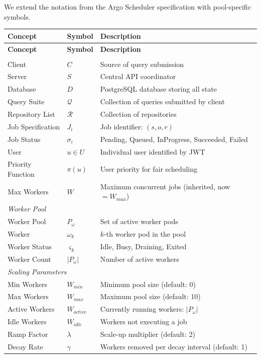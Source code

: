 \documentclass[11pt]{article}
\begin{document}
We extend the notation from the Argo Scheduler specification with pool-specific
symbols.

\begin{center}
  \begin{longtable}{p{4cm}p{2.5cm}p{7.5cm}}
    \toprule
    \textbf{Concept} & \textbf{Symbol} & \textbf{Description} \\
    \midrule
    \endfirsthead

    \toprule
    \textbf{Concept} & \textbf{Symbol} & \textbf{Description} \\
    \midrule
    \endhead

    \midrule
    \endfoot

    \bottomrule
    \endlastfoot

    \multicolumn{3}{l}{\textit{Inherited Symbols (unchanged)}} \\
    Client & $C$ & Source of query submission \\
    Server & $S$ & Central API coordinator \\
    Database & $D$ & PostgreSQL database storing all state \\
    Query Suite & $\mathcal{Q}$ & Collection of queries submitted by client \\
    Repository List & $\mathcal{R}$ & Collection of repositories \\
    Job Specification & $J_i$ & Job identifier: $(s, o, r)$ \\
    Job Status & $\sigma_i$ & Pending, Queued, InProgress, Succeeded, Failed \\
    User & $u \in U$ & Individual user identified by JWT \\
    Priority Function & $\pi(u)$ & User priority for fair scheduling \\
    Max Workers & $W$ & Maximum concurrent jobs (inherited, now $= W_{max}$) \\
    \midrule

    \multicolumn{3}{l}{\textit{Worker Pool}} \\
    Worker Pool & $P_\omega$ & Set of active worker pods \\
    Worker & $\omega_k$ & $k$-th worker pod in the pool \\
    Worker Status & $\varsigma_k$ & Idle, Busy, Draining, Exited \\
    Worker Count & $|P_\omega|$ & Number of active workers \\
    \midrule

    \multicolumn{3}{l}{\textit{Scaling Parameters}} \\
    Min Workers & $W_{min}$ & Minimum pool size (default: 0) \\
    Max Workers & $W_{max}$ & Maximum pool size (default: 10) \\
    Active Workers & $W_{active}$ & Currently running workers: $|P_\omega|$ \\
    Idle Workers & $W_{idle}$ & Workers not executing a job \\
    Ramp Factor & $\lambda$ & Scale-up multiplier (default: 2) \\
    Decay Rate & $\gamma$ & Workers removed per decay interval (default: 1) \\
    \midrule


\end{longtable}
\end{center}
\end{document}
